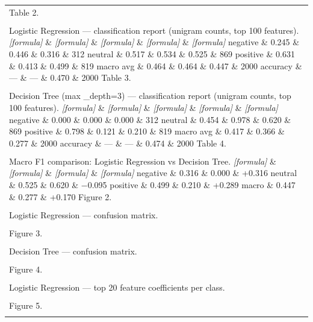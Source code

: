 \documentclass[11pt]{article}
\begin{document}
\begin{longtable}{|p{\dimexpr\linewidth-2\tabcolsep-2\arrayrulewidth\relax}|}
\hline
\rule{0pt}{3.5cm} \\
\hline
Table 2. \\[2pt]
\hline
\rule{0pt}{3.5cm} \\
\hline
Logistic Regression --- classification report (unigram counts, top 100 features). \textit{[formula]} \& \textit{[formula]} \& \textit{[formula]} \& \textit{[formula]} \& \textit{[formula]} negative \& 0.245 \& 0.446 \& 0.316 \& 312 neutral \& 0.517 \& 0.534 \& 0.525 \& 869 positive \& 0.631 \& 0.413 \& 0.499 \& 819 macro avg \& 0.464 \& 0.464 \& 0.447 \& 2000 accuracy \& --- \& --- \& 0.470 \& 2000 Table 3. \\[2pt]
\hline
\rule{0pt}{3.5cm} \\
\hline
Decision Tree (max \_depth=3) --- classification report (unigram counts, top 100 features). \textit{[formula]} \& \textit{[formula]} \& \textit{[formula]} \& \textit{[formula]} \& \textit{[formula]} negative \& 0.000 \& 0.000 \& 0.000 \& 312 neutral \& 0.454 \& 0.978 \& 0.620 \& 869 positive \& 0.798 \& 0.121 \& 0.210 \& 819 macro avg \& 0.417 \& 0.366 \& 0.277 \& 2000 accuracy \& --- \& --- \& 0.474 \& 2000 Table 4. \\[2pt]
\hline
\rule{0pt}{3.5cm} \\
\hline
Macro F1 comparison: Logistic Regression vs Decision Tree. \textit{[formula]} \& \textit{[formula]} \& \textit{[formula]} \& \textit{[formula]} negative \& 0.316 \& 0.000 \& +0.316 neutral \& 0.525 \& 0.620 \& −0.095 positive \& 0.499 \& 0.210 \& +0.289 macro \& 0.447 \& 0.277 \& +0.170 Figure 2. \\[2pt]
\hline
\rule{0pt}{3.5cm} \\
\hline
Logistic Regression --- confusion matrix. \\[2pt]
\hline
\rule{0pt}{3.5cm} \\
\hline
Figure 3. \\[2pt]
\hline
\rule{0pt}{3.5cm} \\
\hline
Decision Tree --- confusion matrix. \\[2pt]
\hline
\rule{0pt}{3.5cm} \\
\hline
Figure 4. \\[2pt]
\hline
\rule{0pt}{3.5cm} \\
\hline
Logistic Regression --- top 20 feature coefficients per class. \\[2pt]
\hline
\rule{0pt}{3.5cm} \\
\hline
Figure 5. \\[2pt]
\hline
\rule{0pt}{3.5cm} \\

\end{longtable}
\end{document}
